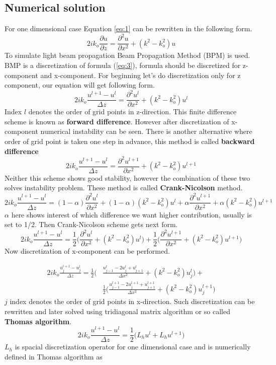 \documentclass[a4paper]{article}
\begin{document}
	\subsection{Numerical solution}
	For one dimensional case Equation \ref{eq:1} can be rewritten in the following form.
	\begin{equation}\label{eq:3}
	2ik_o\frac{\partial u}{\partial z}=\frac{\partial^2 u}{\partial x^2}+(k^2-k_o^2)u
	\end{equation}
	To simulate light beam propagation Beam Propagation Method (BPM) is used. BMP is a discretization of formula (\ref{eq:3}), formula should be discretized for z-component and x-component. For beginning let's do discretization only for z component, our equation will get following form.
	\[2ik_o\frac{u^{l+1}-u^l}{\Delta z}=\frac{\partial^2 u^l}{\partial x^2}+(k^2-k_o^2)u^l\]
	Index $l$ denotes the order of grid points in z-direction. This finite difference scheme is known as {\bf forward difference}. However after discretization of x-component numerical instability can be seen. There is another alternative where order of grid point is taken one step in advance, this method is called {\bf backward difference}
	\[2ik_o\frac{u^{l+1}-u^l}{\Delta z}=\frac{\partial^2 u^{l+1}}{\partial x^2}+(k^2-k_o^2)u^{l+1}\]
	Neither this scheme shows good stability, however the combination of these two solves instability problem. These method is called {\bf Crank-Nicolson} method.
	\[2ik_o\frac{u^{l+1}-u^l}{\Delta z}=(1-\alpha)\frac{\partial^2 u^l}{\partial x^2}+(1-\alpha)(k^2-k_o^2)u^l+\alpha \frac{\partial^2 u^{l+1}}{\partial x^2}+\alpha(k^2-k_o^2)u^{l+1}\]
	$\alpha$ here shows interest of which difference we want higher contribution, usually is set to 1/2. Then Crank-Nicolson scheme gets next form.
	\[2ik_o\frac{u^{l+1}-u^l}{\Delta z}=\frac{1}{2}\bigg(\frac{\partial^2 u^l}{\partial x^2}+(k^2-k_o^2)u^l\bigg)+\frac{1}{2}\bigg(\frac{\partial^2 u^{l+1}}{\partial x^2}+(k^2-k_o^2)u^{l+1}\bigg)\]
	Now discretization of x-component can be performed.

	\begin{equation*}
	\begin{split}
	2ik_o\frac{u_j^{l+1}-u_j^l}{\Delta z}=\frac{1}{2}\bigg(&\frac{u_{j-1}^l-2u_j^l+u_{j+1}^l}{\Delta x^2}+(k^2-k_o^2)u_j^l\bigg)+\\
	& \frac{1}{2}\bigg(\frac{u_{j-1}^{l+1}-2u_j^{l+1}+u_{j+1}^{l+1}}{\Delta x^2}+(k^2-k_o^2)u_j^{l+1}\bigg)
	\end{split}
	\end{equation*}
	$j$ index denotes the order of grid points in x-direction. Such discretization can be rewritten and later solved using tridiagonal matrix algorithm or so called {\bf Thomas algorithm}. 
	\[2ik_o\frac{u^{l+1}-u^l}{\Delta z}=\frac{1}{2}\bigg(L_hu^{l}+L_hu^{l+1}\bigg)\]
	$L_h$ is spacial discretization operator for one dimensional case and is numerically defined in Thomas algorithm as 
\end{document}
